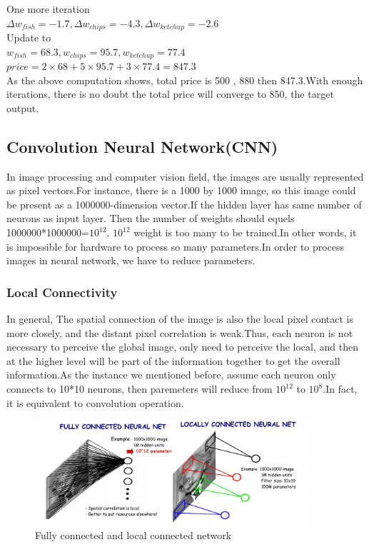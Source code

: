 \documentclass[12pt,a4paper]{report}
\begin{document}
One more iteration\\

$\Delta w_{fish}=-1.7,\Delta w_{chips}=-4.3,\Delta w_{ketchup}=-2.6$   \\

Update to\\

$w_{fish}=68.3,w_{chips}=95.7,w_{ketchup}=77.4$  \\

$price=2\times 68+5\times 95.7+3\times 77.4=847.3$\\
As the above computation  shows, total price is 500 , 880 then 847.3.With enough iterations, there is no doubt the total price will converge to 850, the target output.
\subsection{Convolution Neural Network(CNN)\cite{cnn}\cite{cnn1}\cite{cnn2}}
In image processing and computer vision field, the images are usually  represented as pixel vectors.For instance, there is a 1000 by 1000 image, so this image could be present as a 1000000-dimension vector.If the hidden layer has same number of neurons as input layer. Then the number of weights should equels 1000000*1000000=$10^{12}$. $10^{12}$ weight is too many to be trained.In other words, it is  impossible for hardware to process so many parameters.In order to process images in neural network, we have to reduce parameters.
\subsubsection{Local Connectivity\cite{cnn2}}
In general, The spatial connection of the image is also the local pixel contact is more closely, and the distant pixel correlation is weak.Thus, each neuron is not necessary to perceive the global image, only need to perceive the local, and then at the higher level will be part of the information together to get the overall information.As the instance we mentioned before, assume each neuron only connects to 10*10 neurons, then paremeters will reduce from $10^{12}$ to $10^8$.In fact, it is equivalent to convolution operation.
\begin{figure}[h]
\centering
\includegraphics[width=0.9\textwidth]{localconnect.png}
\caption{Fully connected and local connected network\cite{cnn2}}
\end{figure}
\end{document}
